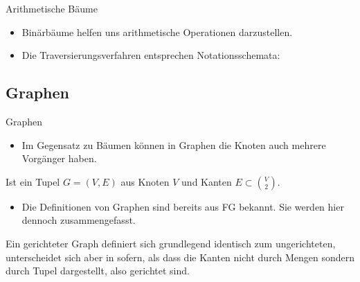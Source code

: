 \begin{frame}{Arithmetische Bäume}
    \begin{itemize}[<+(1)->]
        \item Binärbäume helfen uns arithmetische Operationen darzustellen.
    \end{itemize}
    \pause{}
    \begin{center}
    \end{center}
    \begin{itemize}[<+(1)->]
    \item Die Traversierungsverfahren entsprechen Notationsschemata: 
    \end{itemize}
\end{frame}


\subsection{Graphen}

\begin{frame}{Graphen}
    \begin{itemize}[<+(1)->]
        \item Im Gegensatz zu Bäumen können in Graphen die Knoten auch mehrere Vorgänger haben.
    \end{itemize}
    \pause{}
    \begin{definition}
        Ist ein Tupel \(G = (V,E)\) aus Knoten \(V\) und Kanten \(E \subset \binom{V}{2}\).
    \end{definition}
    \begin{itemize}[<+(1)->]
        \item Die Definitionen von Graphen sind bereits aus FG bekannt. Sie werden hier dennoch zusammengefasst.
    \end{itemize}
    \pause{}
    \begin{definition}
        Ein gerichteter Graph definiert sich grundlegend identisch zum ungerichteten, unterscheidet sich aber in sofern, als dass die Kanten nicht durch Mengen sondern durch Tupel dargestellt, also gerichtet sind.
    \end{definition}
\end{frame}


